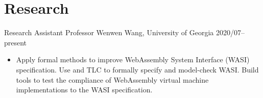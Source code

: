 \section{Research}

\begin{experiencelist}
    \experienceitem
        {Research Assistant}
        {Professor Wenwen Wang, University of Georgia}
        {2020/07--present}
    \begin{itemize}[noitemsep, topsep=0pt]
        \item
            Apply formal methods to improve WebAssembly System Interface (WASI)
            specification. Use \tlaplus and TLC to formally specify and
            model-check WASI. Build tools to test the compliance of WebAssembly
            virtual machine implementations to the WASI specification.
    \end{itemize}
\end{experiencelist}
